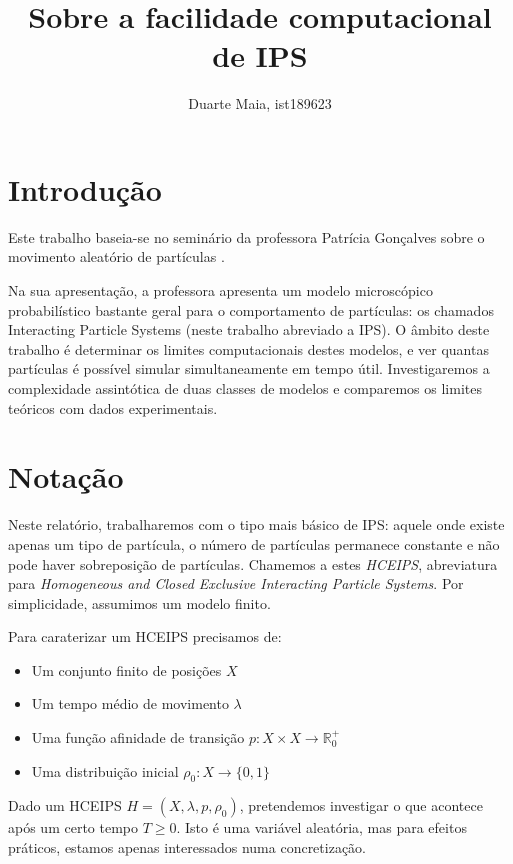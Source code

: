 \documentclass{article}
\title{Sobre a facilidade computacional de IPS}
\author{Duarte Maia, ist189623}
\date{}
\newcommand{\R}{\mathbb{R}}
\begin{document}
	\maketitle

	\section{Introdução}

	Este trabalho baseia-se no seminário da professora Patrícia Gonçalves sobre o movimento aleatório de partículas \cite{pat}. 
	
	Na sua apresentação, a professora apresenta um modelo microscópico probabilístico bastante geral para o comportamento de partículas: os chamados Interacting Particle Systems (neste trabalho abreviado a IPS). O âmbito deste trabalho é determinar os limites computacionais destes modelos, e ver quantas partículas é possível simular simultaneamente em tempo útil. Investigaremos a complexidade assintótica de duas classes de modelos e comparemos os limites teóricos com dados experimentais.

	\section{Notação}
	
	Neste relatório, trabalharemos com o tipo mais básico de IPS: aquele onde existe apenas um tipo de partícula, o número de partículas permanece constante e não pode haver sobreposição de partículas. Chamemos a estes \emph{HCEIPS}, abreviatura para \emph{Homogeneous and Closed Exclusive Interacting Particle Systems}. Por simplicidade, assumimos um modelo finito.
	
	Para caraterizar um HCEIPS precisamos de:
	
	\begin{itemize}
	\item Um conjunto finito de posições $X$
	
	\item Um tempo médio de movimento $\lambda$
	
	\item Uma função afinidade de transição $p : X \times X \rightarrow \R^+_0$
	
	\item Uma distribuição inicial $\rho_0 : X \rightarrow \{0,1\}$
	\end{itemize}
	
	Dado um HCEIPS $H = (X, \lambda, p, \rho_0)$, pretendemos investigar o que acontece após um certo tempo $T \geq 0$. Isto é uma variável aleatória, mas para efeitos práticos, estamos apenas interessados numa concretização.
	
\end{document}
